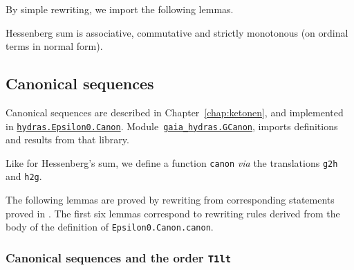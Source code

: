 \vspace{4pt} 
\noindent


By simple rewriting, we import the following lemmas.




Hessenberg sum is associative, commutative and strictly monotonous (on ordinal terms in normal form).


\subsection{Canonical sequences}
\label{sect:gcanon}
Canonical sequences are described in Chapter~\vref{chap:ketonen}, and implemented in
\href{../theories/html/hydras.Epsilon0.Canon.html}%
{\texttt{hydras.Epsilon0.Canon}}.
Module~\href{../theories/html/gaia_hydras.GCanon.html}%
{\texttt{gaia\_hydras.GCanon}}, imports definitions and results from that library.


Like for Hessenberg's sum, we define a function \texttt{canon}
\emph{via} the
translations \texttt{g2h} and \texttt{h2g}.


The following lemmas are proved by rewriting from corresponding statements proved in \HydrasLib. The first six lemmas correspond to rewriting rules derived from the body of the definition of \texttt{Epsilon0.Canon.canon}.





\subsubsection{Canonical sequences and the order \texttt{T1lt}}

